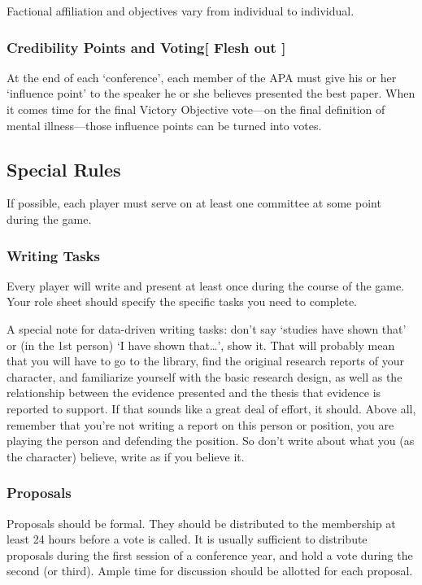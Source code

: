 Factional affiliation and objectives vary from individual to individual.

\subsubsection{Credibility Points and Voting[ Flesh out
]}
\label{credibilitypointsandvoting}

At the end of each `conference', each member of the APA must give his or her `influence point' to the speaker he or she believes presented the best paper. When it comes time for the final Victory Objective vote---on the final definition of mental illness---those influence points can be turned into votes.

\subsection{Special Rules}
\label{specialrules}

If possible, each player must serve on at least one committee at some point during the game.

\subsubsection{Writing Tasks}
\label{writingtasks}

Every player will write and present at least once during the course of the game. Your role sheet should specify the specific tasks you need to complete.

A special note for data-driven writing tasks: don't say `studies have shown that' or (in the 1st person) `I have shown that{\ldots}', show it. That will probably mean that you will have to go to the library, find the original research reports of your character, and familiarize yourself with the basic research design, as well as the relationship between the evidence presented and the thesis that evidence is reported to support. If that sounds like a great deal of effort, it should. Above all, remember that you're not writing a report on this person or position, you are playing the person and defending the position. So don't write about what you (as the character) believe, write as if you believe it.

\subsubsection{Proposals}
\label{proposals}

Proposals should be formal. They should be distributed to the membership at least 24 hours before a vote is called. It is usually sufficient to distribute proposals during the first session of a conference year, and hold a vote during the second (or third). Ample time for discussion should be allotted for each proposal.

